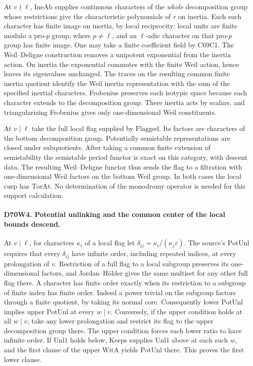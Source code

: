 At $v\nmid\ell$, $\mathrm{IneAb}$ supplies continuous characters
of the \emph{whole} decomposition group whose restrictions give the
characteristic polynomials of $r$ on inertia. Each such character
has finite image on inertia, by local reciprocity: local units
are finite modulo a pro-$p$ group, where $p\ne\ell$, and an
$\ell$-adic character on that pro-$p$ group has finite image.
One may take a finite coefficient field by C69C1.
The Weil--Deligne construction removes a unipotent exponential
from the inertia action. On inertia the exponential commutes with
the finite Weil action, hence leaves its eigenvalues unchanged.
The traces on the resulting common finite inertia quotient identify
the Weil inertia representation with the sum of the specified
inertial characters. Frobenius preserves each isotypic space
because each character extends to the decomposition group. There
inertia acts by scalars, and triangularizing Frobenius gives only
one-dimensional Weil constituents.

At $v\mid\ell$ take the full local flag supplied by $\mathrm{Flagged}$.
Its factors are characters of the bottom decomposition group.
Potentially semistable representations are closed under subquotients.
After taking a common finite extension of semistability the
semistable period functor is exact on this category, with descent
data. The resulting Weil--Deligne functor thus sends the flag to
a filtration with one-dimensional Weil factors on the bottom
Weil group. In both cases the local cusp has $\mathrm{TorAt}$.
No determination of the monodromy operator is needed for this
support calculation.

\paragraph{D70W4. Potential unlinking and the common center of the local bounds descend.}
At $v\mid\ell$, for characters $\kappa_i$ of a local flag let
$\delta_{ij}=\kappa_i/(\kappa_j\varepsilon)$. The source's
$\mathrm{PotUnl}$ requires that every $\delta_{ij}$ have infinite
order, including repeated indices, at every prolongation of $v$.
Restriction of a full flag to a local subgroup preserves its
one-dimensional factors, and Jordan--H\"older gives the same
multiset for any other full flag there. A character has finite
order exactly when its restriction to a subgroup of finite index
has finite order. Indeed a power trivial on the subgroup factors
through a finite quotient, by taking its normal core. Consequently
lower $\mathrm{PotUnl}$ implies upper $\mathrm{PotUnl}$ at every
$w\mid v$. Conversely, if the upper condition holds at all $w\mid v$,
take any lower prolongation and restrict its flag to the upper
decomposition group there. The upper condition forces each lower
ratio to have infinite order. If $\mathrm{Unl1}$ holds below,
$\mathrm{Keeps}$ supplies $\mathrm{Unl1}$ above at each such $w$,
and the first clause of the upper $\mathrm{WitA}$ yields
$\mathrm{PotUnl}$ there. This proves the first lower clause.

